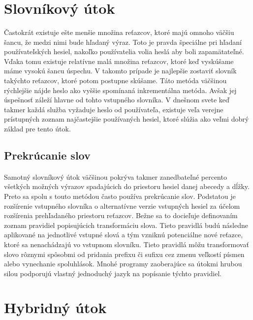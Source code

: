 \section{Slovníkový útok}
\paragraph{}
Častokrát existuje ešte menšie množina reťazcov, ktoré majú omnoho väčšiu šancu, že medzi nimi bude hľadaný výraz. Toto je pravda špeciálne pri hľadaní používateľských hesiel, nakoľko používatelia volia heslá aby boli zapamätateľné. Vďaka tomu existuje relatívne malá množina reťazcov, ktoré keď vyskúšame máme vysokú šancu úspechu. V takomto prípade je najlepšie zostaviť slovník takýchto reťazcov, ktoré potom postupne skúšame. Táto metóda väčšinou rýchlejšie nájde heslo ako vyššie spomínaná inkrementálna metóda. Avšak jej úspešnosť záleží hlavne od tohto vstupného slovníka. V dnešnom svete keď takmer každá služba vyžaduje heslo od používateľa, existuje veľa verejne prístupných zoznam najčastejšie používaných hesiel, ktoré slúžia ako veľmi dobrý základ pre tento útok.

\subsection{Prekrúcanie slov}
\paragraph{}
Samotný slovníkový útok väčšinou pokrýva takmer zanedbateľné percento všetkých možných výrazov spadajúcich do priestoru hesiel danej abecedy a dĺžky. Preto sa spolu s touto metódou často používa prekrúcanie slov. Podstatou je rozšírenie vstupného slovníka o alternatívne verzie vstupných hesiel za účelom rozšírenia prehľadaného priestoru reťazcov. Bežne sa to docieľuje definovaním zoznam pravidiel popisujúcich transformáciu slova. Tieto pravidlá budú následne aplikované na jednotlivé vstupné slová a tým vzniknú potenciálne nové reťazce, ktoré sa nenachádzajú vo vstupnom slovníku. Tieto pravidlá môžu transformovať slovo rôznymi spôsobmi od pridania prefixu či sufixu cez zmenu veľkostí písmen alebo vynechanie spoluhlások. Mnohé programy zaoberajúce sa útokmi hrubou silou podporujú vlastný jednoduchý jazyk na popísanie týchto pravidiel.

\section{Hybridný útok}
